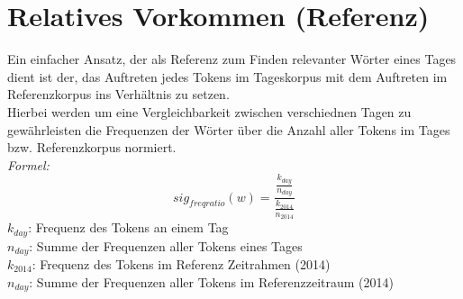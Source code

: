 
\section{Relatives Vorkommen (Referenz)}
Ein einfacher Ansatz, der als Referenz zum Finden relevanter Wörter eines Tages dient ist der, das Auftreten jedes Tokens im Tageskorpus mit dem Auftreten im Referenzkorpus ins Verhältnis zu setzen.\\
Hierbei werden um eine Vergleichbarkeit zwischen verschiednen Tagen zu gewährleisten die Frequenzen der Wörter über die Anzahl aller Tokens im Tages bzw. Referenzkorpus normiert.\\

	\emph{Formel: } 
	\begin{equation}
	sig_{freqratio}(w) = \frac{\frac{k_{day}}{n_{day}}}{\frac{k_{2014}}{n_{2014}}}
	\end{equation}
	$k_{day}$: Frequenz des Tokens an einem Tag\\
	$n_{day}$: Summe der Frequenzen aller Tokens eines Tages\\
	$k_{2014}$: Frequenz des Tokens im Referenz Zeitrahmen (2014)\\
	$n_{day}$: Summe der Frequenzen aller Tokens im Referenzzeitraum (2014)\\
	

